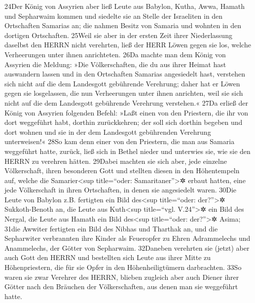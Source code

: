 24Der König von Assyrien aber ließ Leute aus Babylon, Kutha, Awwa,
Hamath und Sepharwaim kommen und siedelte sie an Stelle der Israeliten
in den Ortschaften Samarias an; die nahmen Besitz von Samaria und
wohnten in den dortigen Ortschaften. 25Weil sie aber in der ersten Zeit
ihrer Niederlassung daselbst den HERRN nicht verehrten, ließ der HERR
Löwen gegen sie los, welche Verheerungen unter ihnen anrichteten. 26Da
machte man dem König von Assyrien die Meldung: »Die Völkerschaften, die
du aus ihrer Heimat hast auswandern lassen und in den Ortschaften
Samarias angesiedelt hast, verstehen sich nicht auf die dem Landesgott
gebührende Verehrung; daher hat er Löwen gegen sie losgelassen, die nun
Verheerungen unter ihnen anrichten, weil sie sich nicht auf die dem
Landesgott gebührende Verehrung verstehen.« 27Da erließ der König von
Assyrien folgenden Befehl: »Laßt einen von den Priestern, die ihr von
dort weggeführt habt, dorthin zurückkehren; der soll sich dorthin
begeben und dort wohnen und sie in der dem Landesgott gebührenden
Verehrung unterweisen!« 28So kam denn einer von den Priestern, die man
aus Samaria weggeführt hatte, zurück, ließ sich in Bethel nieder und
unterwies sie, wie sie den HERRN zu verehren hätten. 29Dabei machten sie
sich aber, jede einzelne Völkerschaft, ihren besonderen Gott und
stellten diesen in den Höhentempeln auf, welche die
Samarier\textless sup title=``oder: Samaritaner''\textgreater✲ erbaut
hatten, eine jede Völkerschaft in ihren Ortschaften, in denen sie
angesiedelt waren. 30Die Leute von Babylon z.B. fertigten ein Bild
des\textless sup title=``oder: der?''\textgreater✲ Sukkoth-Benoth an,
die Leute aus Kuth\textless sup title=``vgl. V.24''\textgreater✲ ein
Bild des Nergal, die Leute aus Hamath ein Bild des\textless sup
title=``oder: der?''\textgreater✲ Asima; 31die Awwiter fertigten ein
Bild des Nibhas und Tharthak an, und die Sepharwiter verbrannten ihre
Kinder als Feueropfer zu Ehren Adrammelechs und Anammelechs, der Götter
von Sepharwaim. 32Daneben verehrten sie (jetzt) aber auch Gott den HERRN
und bestellten sich Leute aus ihrer Mitte zu Höhenpriestern, die für sie
Opfer in den Höhenheiligtümern darbrachten. 33So waren sie zwar Verehrer
des HERRN, blieben zugleich aber auch Diener ihrer Götter nach den
Bräuchen der Völkerschaften, aus denen man sie weggeführt hatte.

